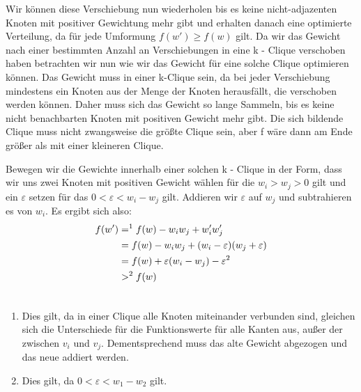 \documentclass[12pt, a4paper]{article}
\begin{document}
Wir können diese Verschiebung nun wiederholen bis es keine nicht-adjazenten Knoten mit positiver Gewichtung mehr gibt und erhalten danach eine optimierte Verteilung, da für jede Umformung $f(w') \ge f(w)$ gilt. Da wir das Gewicht nach einer bestimmten Anzahl an Verschiebungen in eine k - Clique verschoben haben betrachten wir nun wie wir das Gewicht für eine solche Clique optimieren können. Das Gewicht muss in einer k-Clique sein, da bei jeder Verschiebung mindestens ein Knoten aus der Menge der Knoten herausfällt, die verschoben werden können. Daher muss sich das Gewicht so lange Sammeln, bis es keine nicht benachbarten Knoten mit positiven Gewicht mehr gibt.
Die sich bildende Clique muss nicht zwangsweise die größte Clique sein, aber f wäre dann am Ende größer als mit einer kleineren Clique.

Bewegen wir die Gewichte innerhalb einer solchen k - Clique in der Form, dass wir uns zwei Knoten mit positiven Gewicht wählen für die $w_i > w_j > 0$ gilt und ein $\varepsilon$ setzen für das $0 < \varepsilon < w_i - w_j$ gilt. Addieren wir $\varepsilon$ auf $w_j$ und subtrahieren es von $w_i$. Es ergibt sich also:
\begin{gather}
\begin{split}f(w') &=^1 f(w) - w_i w_j + w'_i w'_j \\
&= f(w) - w_i w_j + (w_i - \varepsilon)(w_j + \varepsilon) \\
&= f(w) + \varepsilon (w_i - w_j) - \varepsilon^2 \\
&>^2 f(w)\end{split}\notag\\\begin{split}\end{split}\notag
\end{gather}\begin{enumerate}
\item {}
Dies gilt, da in einer Clique alle Knoten miteinander verbunden sind, gleichen sich die Unterschiede für die Funktionswerte für alle Kanten aus, außer der zwischen $v_i$ und $v_j$. Dementsprechend muss das alte Gewicht abgezogen und das neue addiert werden.

\item {}
Dies gilt, da $0 < \varepsilon < w_1 - w_2$ gilt.

\end{enumerate}
\end{document}
